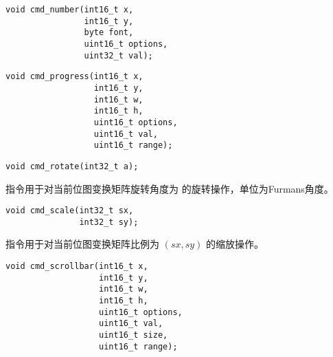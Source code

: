 \begin{framed}
\begin{verbatim}
void cmd_number(int16_t x,
                int16_t y,
                byte font,
                uint16_t options,
                uint32_t val);
\end{verbatim}
\end{framed}



\begin{framed}
\begin{verbatim}
void cmd_progress(int16_t x,
                  int16_t y,
                  int16_t w,
                  int16_t h,
                  uint16_t options,
                  uint16_t val,
                  uint16_t range);
\end{verbatim}
\end{framed}



\begin{framed}
\begin{verbatim}
void cmd_rotate(int32_t a);
\end{verbatim}
\end{framed}

 指令用于对当前位图变换矩阵旋转角度为  的旋转操作，单位为Furmans角度。


\begin{framed}
\begin{verbatim}
void cmd_scale(int32_t sx,
               int32_t sy);
\end{verbatim}
\end{framed}

 指令用于对当前位图变换矩阵比例为 $(sx, sy)$ 的缩放操作。
\fsixteen


\begin{framed}
\begin{verbatim}
void cmd_scrollbar(int16_t x,
                   int16_t y,
                   int16_t w,
                   int16_t h,
                   uint16_t options,
                   uint16_t val,
                   uint16_t size,
                   uint16_t range);
\end{verbatim}
\end{framed}


